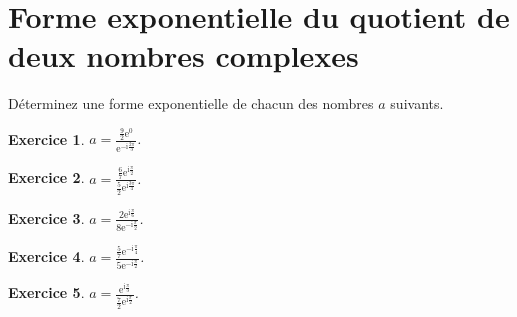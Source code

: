\documentclass[a4paper]{article}
\newtheorem{Exercice}{Exercice}
\begin{document}
\medskip

\begin{minipage}{0.45\linewidth}
 \section*{Forme exponentielle du quotient de deux nombres complexes}%
     D\'eterminez une forme exponentielle de chacun des nombres $a$ suivants.\begin{Exercice}
$\displaystyle a=\frac{\frac{9}{2}\mathrm{e}^{0}}{\mathrm{e}^{-\mathrm{i}\frac{2 \pi }{3}}}$.
\end{Exercice}
\begin{Exercice}
$\displaystyle a=\frac{\frac{6}{7}\mathrm{e}^{\mathrm{i}\frac{\pi }{2}}}{\frac{5}{2}\mathrm{e}^{\mathrm{i}\frac{3 \pi }{4}}}$.
\end{Exercice}
\begin{Exercice}
$\displaystyle a=\frac{2\mathrm{e}^{\mathrm{i}\frac{\pi }{6}}}{8\mathrm{e}^{-\mathrm{i}\frac{\pi }{2}}}$.
\end{Exercice}
\begin{Exercice}
$\displaystyle a=\frac{\frac{5}{7}\mathrm{e}^{-\mathrm{i}\frac{\pi }{4}}}{5\mathrm{e}^{-\mathrm{i}\frac{\pi }{2}}}$.
\end{Exercice}
\begin{Exercice}
$\displaystyle a=\frac{\mathrm{e}^{\mathrm{i}\frac{\pi }{3}}}{\frac{7}{2}\mathrm{e}^{\mathrm{i}\frac{\pi }{2}}}$.
\end{Exercice} 
\end{minipage}\hfill%
\end{document}
